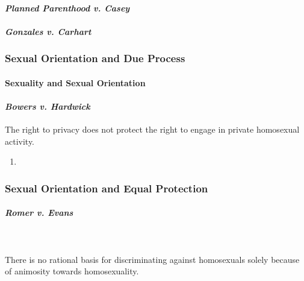  
\paragraph{\emph{Planned Parenthood v. Casey}}
 
 
\paragraph{\emph{Gonzales v. Carhart}}
 
 
\subsubsection{Sexual Orientation and Due Process}
 
\paragraph{Sexuality and Sexual Orientation}
 
 
\paragraph{\emph{Bowers v. Hardwick}}

The right to privacy does not protect the right to engage in private 
homosexual activity.

\begin{enumerate}
    \item %
\end{enumerate}
 
\subsubsection{Sexual Orientation and Equal Protection}

\paragraph{\emph{Romer v. Evans}}
~\\\\
There is no rational basis for discriminating against homosexuals solely 
because of animosity towards homosexuality.

